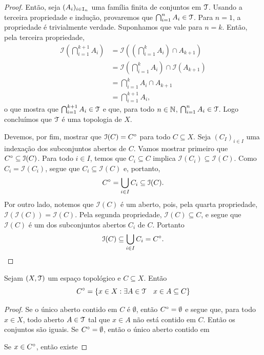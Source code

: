 \begin{proof}
	Então, seja $(A_i)_{i \in \mathtt I_n}$ uma família finita de conjuntos em $\mathcal{T}$. Usando a terceira propriedade e indução, provaremos que $\bigcap_{i=1}^{n} A_i \in \mathcal{T}$. Para $n=1$, a propriedade é trivialmente verdade. Suponhamos que vale para $n=k$. Então, pela terceira propriedade,
	\begin{align*}
	\mathcal I \left( \bigcap_{i=1}^{k+1} A_i \right)
	&= \mathcal I \left( \left( \bigcap_{i=1}^{k} A_i \right) \cap A_{k+1} \right) \\
	&= \mathcal I \left( \bigcap_{i=1}^{k} A_i \right) \cap \mathcal I \left( A_{k+1} \right) \\
	&= \bigcap_{i=1}^{k} A_i \cap A_{k+1} \\
	&= \bigcap_{i=1}^{k+1} A_i,
	\end{align*}
o que mostra que $\bigcap_{i=1}^{k+1} A_i \in \mathcal{T}$ e que, para todo $n \in \mathbb{N}$, $\bigcap_{i=1}^{n} A_i \in \mathcal{T}$. Logo concluímos que $\mathcal{T}$ é uma topologia de $X$.

Devemos, por fim, mostrar que $\mathcal I(C)={C}^\circ$ para todo $C \subseteq X$. Seja $(C_I)_{i \in I}$ uma indexação dos subconjuntos abertos de $C$. Vamos mostrar primeiro que ${C}^\circ \subseteq \mathcal I(C)$. Para todo $i \in I$, temos que $C_i \subseteq C$ implica $\mathcal I(C_i) \subseteq \mathcal I(C)$. Como $C_i = \mathcal I(C_i)$, segue que $C_i \subseteq \mathcal I(C)$ e, portanto,
	\begin{equation*}
	{C}^\circ = \bigcup_{i \in I} C_i \subseteq \mathcal I(C).
	\end{equation*}
	Por outro lado, notemos que $\mathcal I(C)$ é um aberto, pois, pela quarta propriedade, $\mathcal I(\mathcal I(C))= \mathcal I(C)$. Pela segunda propriedade, $\mathcal I(C) \subseteq C$, e segue que $\mathcal I(C)$ é um dos subconjuntos abertos $C_i$ de $C$. Portanto	
	\begin{equation*}
	\mathcal I(C) \subseteq \bigcup_{i \in I} C_i = {C}^\circ.
	\end{equation*}
\end{proof}

\begin{prop}
	Sejam $(X, \mathcal{T})$ um espaço topológico e $C \subseteq X$. Então
	\begin{equation*}
	{C}^\circ = \{x \in X : \exists A \in \mathcal{T} \quad x \in A \subseteq C\}
	\end{equation*}
\end{prop}
\begin{proof}
	Se o único aberto contido em $C$ é $\emptyset$, então ${C}^\circ=\emptyset$ e segue que, para todo $x \in X$, todo aberto $A \in \mathcal{T}$ tal que $x \in A$ não está contido em $C$. Então os conjuntos são iguais.
	Se ${C}^\circ=\emptyset$, então o único aberto contido em 
	
	
	Se $x \in {C}^\circ$, então existe
\end{proof}









